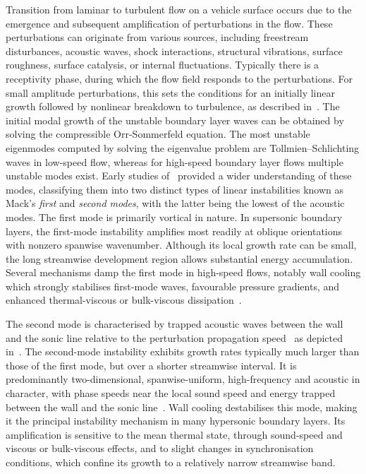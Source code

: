 Transition from laminar to turbulent flow on a vehicle surface occurs due to the emergence and subsequent amplification of perturbations in the flow. These perturbations can originate from various sources, including freestream disturbances, acoustic waves, shock interactions, structural vibrations, surface roughness, surface catalysis, or internal fluctuations. Typically there is a receptivity phase, during which the flow field responds to the perturbations. For small amplitude perturbations, this sets the conditions for an initially linear growth followed by nonlinear breakdown to turbulence, as described in~\cite{reshotko2008}. The initial modal growth of the unstable boundary layer waves can be obtained by solving the compressible Orr-Sommerfeld equation. The most unstable eigenmodes computed by solving the eigenvalue problem are Tollmien--Schlichting waves in low-speed flow, whereas for high-speed boundary layer flows multiple unstable modes exist. Early studies of~\cite{Mack1969} provided a wider understanding of these modes, classifying them into two distinct types of linear instabilities known as Mack's \textit{first} and \textit{second modes}, with the latter being the lowest of the acoustic modes. The first mode is primarily vortical in nature. In supersonic boundary layers, the first-mode instability amplifies most readily at oblique orientations with nonzero spanwise wavenumber. Although its local growth rate can be small, the long streamwise development region allows substantial energy accumulation. Several mechanisms damp the first mode in high-speed flows, notably wall cooling which strongly stabilises first-mode waves, favourable pressure gradients, and enhanced thermal-viscous or bulk-viscous dissipation~\citep{Mack1984}.

The second mode is characterised by trapped acoustic waves between the wall and the sonic line relative to the perturbation propagation speed~\citep{Fedorov2001} as depicted in~. The second-mode instability exhibits growth rates typically much larger than those of the first mode, but over a shorter streamwise interval. It is predominantly two-dimensional, spanwise-uniform, high-frequency and acoustic in character, with phase speeds near the local sound speed and energy trapped between the wall and the sonic line~\citep{DeTullio2013}. Wall cooling destabilises this mode, making it the principal instability mechanism in many hypersonic boundary layers. Its amplification is sensitive to the mean thermal state, through sound-speed and viscous or bulk-viscous effects, and to slight changes in synchronisation conditions, which confine its growth to a relatively narrow streamwise band.



